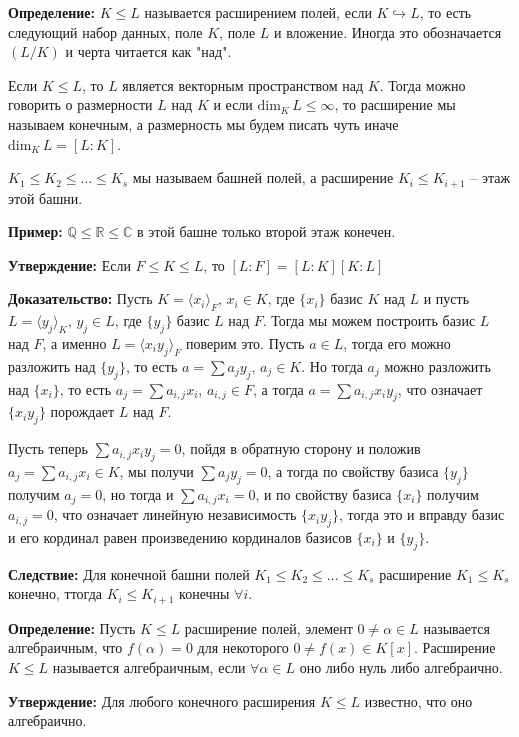 \documentclass[a4paper, 12pt]{book}
\begin{document}
\textbf{Определение:} $K\leq L$ называется расширением полей, если $K
\hookrightarrow L$, то есть следующий набор данных, поле $K$, поле $L$ и
вложение. Иногда это обозначается $(L/K)$ и черта читается как "над".

Если $K\leq L$, то $L$ является векторным пространством над $K$. Тогда можно
говорить о размерности $L$ над $K$ и если $\text{dim}_K\,L\le\infty$, то
расширение мы называем конечным, а размерность мы будем писать чуть иначе
$\text{dim}_K\,L=[L:K]$.

$K_1\le K_2\le\ldots\le K_s$ мы называем башней полей, а расширение $K_i\le
K_{i+1}$ – этаж этой башни.

\textbf{Пример:} $\mathbb{Q}\le\mathbb{R}\le\mathbb{C}$ в этой башне только
второй этаж конечен.

\textbf{Утверждение:} Если $F\le K\le L$, то $[L:F]=[L:K][K:L]$

\textbf{Доказательство:} Пусть $K=\langle x_i\rangle_F,\,x_i\in K$, где
$\{x_i\}$ базис $K$ над $L$ и пусть $L=\langle y_j\rangle_K,\,y_j\in L$, где
$\{y_j\}$ базис $L$ над $F$. Тогда мы можем построить базис $L$ над $F$, а
именно $L=\langle x_iy_j \rangle_F$ поверим это. Пусть $a\in L$, тогда его
можно разложить над $\{y_j\}$, то есть $a=\sum a_jy_j,\,a_j\in K$. Но тогда
$a_j$ можно разложить над $\{x_i\}$, то есть $a_j=\sum a_{i,j}x_i,\,a_{i,j}\in
F$, а тогда $a=\sum a_{i,j}x_iy_j$, что означает $\{x_iy_j\}$ порождает $L$ над
$F$.

Пусть теперь $\sum a_{i,j}x_iy_j=0$, пойдя в обратную сторону и положив $a_j=
\sum a_{i,j}x_i\in K$, мы получи $\sum a_jy_j=0$, а тогда по свойству базиса
$\{y_j\}$ получим $a_j=0$, но тогда и $\sum a_{i,j}x_i=0$, и по свойству базиса
$\{x_i\}$ получим $a_{i,j}=0$, что означает линейную независимость $\{x_iy_j\}$,
тогда это и вправду базис и его кординал равен произведению кординалов базисов
$\{x_i\}$ и $\{y_j\}$.

\textbf{Следствие:} Для конечной башни полей $K_1\le K_2\le\ldots\le K_s$
расширение $K_1\le K_s$ конечно, ттогда $K_i\le K_{i+1}$ конечны $\forall i$.

\textbf{Определение:} Пусть $K\le L$ расширение полей, элемент $0\neq\alpha\in
L$ называется алгебраичным, что $f(\alpha)=0$ для некоторого $0\neq f(x)\in K[x]$.
Расширение $K\le L$ называется алгебраичным, если $\forall\alpha\in L$ оно либо
нуль либо алгебраично.

\textbf{Утверждение:} Для любого конечного расширения $K\le L$ известно, что
оно алгебраично.
\end{document}
